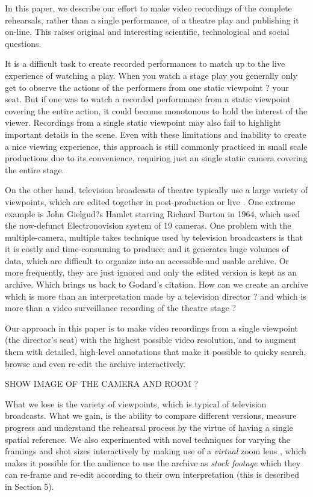 \documentclass[conference]{IEEEtran}
\begin{document}
In this paper, we describe our effort to make video recordings of the complete rehearsals,
rather than a single performance, of a theatre play and publishing it on-line. This raises original
and interesting scientific, technological and social questions.

It is a difficult task to create recorded performances to match up to the live experience
of watching a play. When you watch a stage play you generally only get to observe the actions 
of the performers from one static viewpoint ? your seat. But if one was to watch a recorded 
performance from a static viewpoint covering the entire action, it could become monotonous 
to hold the interest of the viewer. Recordings from a single static viewpoint may also fail to 
highlight important details in the scene. Even with these limitations and inability to create a nice 
viewing experience, this approach is still commonly practiced in small scale productions due to 
its convenience, requiring just an single static camera covering the entire stage. 


On the other hand, television broadcasts of theatre typically use a large variety of viewpoints, which are edited together
in post-production or live \cite{Bouchez07}. One extreme example is John Gielgud?s 
Hamlet starring Richard Burton in 1964, which used  the now-defunct Electronovision system of 19 cameras. 
One problem with the multiple-camera, multiple takes technique used by television broadcasters 
is that it is costly and time-consuming to produce; and it generates huge volumes of data, which are 
difficult to organize into an accessible and usable archive. Or more frequently, they are just ignored
and only the edited version is kept as an archive. Which brings us back to Godard's citation. How can we create 
an archive which is  more than an interpretation made by a television director ? and which is more than a video surveillance 
recording of the theatre stage ? 

Our approach in this paper is to make video recordings from a single viewpoint (the director's seat) with the highest possible
video resolution, and to augment them with detailed, high-level  annotations that make it possible to quicky  search, browse
and even re-edit the archive interactively. 


SHOW IMAGE OF THE CAMERA AND ROOM ?

What we lose is the variety of viewpoints, which is typical of television broadcasts. What we gain, is the ability to compare
different versions, measure progress and understand the rehearsal process by the virtue of having a single spatial reference.
We also experimented with novel techniques for varying the framings and shot sizes interactively 
by making use of a {\em virtual}  zoom lens \cite{Gandhi14}, which makes it possible for the audience to
use the archive as {\em stock footage} which they can re-frame and re-edit according to their own interpretation (this is described in Section 5). 
\end{document}
